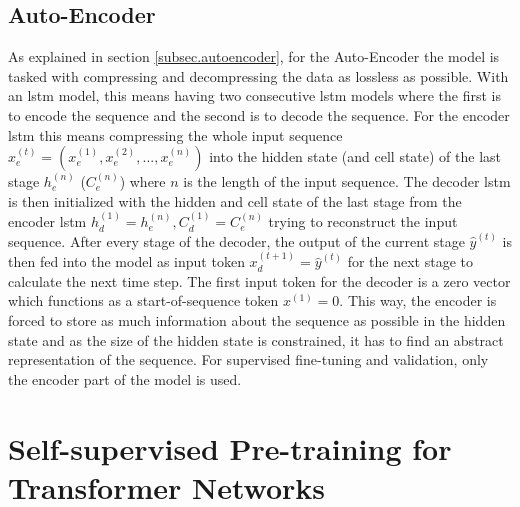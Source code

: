 \subsection{Auto-Encoder} \label{sec:experiments_lstm_auto_encoder}

As explained in section \ref{subsec.autoencoder}, for the Auto-Encoder the model is tasked with compressing and decompressing the data as lossless as possible. With an \gls{lstm} model, this means having two consecutive \gls{lstm} models where the first is to encode the sequence and the second is to decode the sequence. For the encoder \gls{lstm} this means compressing the whole input sequence $x_e^{(t)} = (x_e^{(1)}, x_e^{(2)}, ..., x_e^{(n)})$ into the hidden state (and cell state) of the last stage $h_e^{(n)}$ ($C_e^{(n)}$) where $n$ is the length of the input sequence. 
The decoder \gls{lstm} is then initialized with the hidden and cell state of the last stage from the encoder \gls{lstm} $h_d^{(1)} = h_e^{(n)}, C_d^{(1)} = C_e^{(n)}$ trying to reconstruct the input sequence. After every stage of the decoder, the output of the current stage $\hat{y}^{(t)}$ is then fed into the model as input token  $x_d^{(t+1)} = \hat{y}^{(t)}$ for the next stage to calculate the next time step. The first input token for the decoder is a zero vector which functions as a start-of-sequence token $x^{(1)} = 0$. This way, the encoder is forced to store as much information about the sequence as possible in the hidden state and as the size of the hidden state is constrained, it has to find an abstract representation of the sequence. For supervised fine-tuning and validation, only the encoder part of the model is used. 

\section{Self-supervised Pre-training for Transformer Networks} \label{sec:experiments_transformer}

